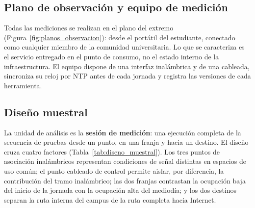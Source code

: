 \subsection{Plano de observación y equipo de medición}

Todas las mediciones se realizan en el plano del extremo (Figura~\ref{fig:planos_observacion}): desde el portátil del estudiante, conectado como cualquier miembro de la comunidad universitaria. Lo que se caracteriza es el servicio entregado en el punto de consumo, no el estado interno de la infraestructura. El equipo dispone de una interfaz inalámbrica y de una cableada, sincroniza su reloj por NTP antes de cada jornada y registra las versiones de cada herramienta. 

\subsection{Diseño muestral}

La unidad de análisis es la \textbf{sesión de medición}: una ejecución completa de la secuencia de pruebas desde un punto, en una franja y hacia un destino. El diseño cruza cuatro factores (Tabla~\ref{tab:diseno_muestral}). Los tres puntos de asociación inalámbricos representan condiciones de señal distintas en espacios de uso común; el punto cableado de control permite aislar, por diferencia, la contribución del tramo inalámbrico; las dos franjas contrastan la ocupación baja del inicio de la jornada con la ocupación alta del mediodía; y los dos destinos separan la ruta interna del campus de la ruta completa hacia Internet.

